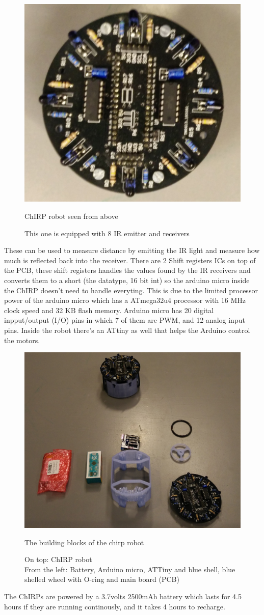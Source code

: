 \begin{figure}[h]
\centering
\includegraphics[width=0.8\linewidth]{images/chirpAbove.jpg}
\caption{ChIRP robot seen from above}
\caption*{This one is equipped with 8 IR emitter and receivers}
\end{figure}
These can be used to measure distance by emitting the IR light and measure how much is reflected back into the receiver. There are 2 Shift registers ICs on top of the PCB, these shift registers handles the values found by the IR receivers and converts them to a short (the datatype, 16 bit int) so the arduino micro inside the ChIRP doesn't need to handle everyting. This is due to the limited processor power of the arduino micro which has a ATmega32u4 processor with 16 MHz clock speed and 32 KB flash memory. Arduino micro has 20 digital inpput/output (I/O) pins in which 7 of them are PWM, and 12 analog input pins. Inside the robot there's an ATtiny as well that helps the Arduino control the motors.


\begin{figure}[h]
\centering
\includegraphics[width=0.8\linewidth]{images/chirpPieces.jpg}
\caption{The building blocks of the chirp robot}
\caption*{On top: ChIRP robot\\From the left: Battery, Arduino micro, ATTiny and blue shell, blue shelled wheel with O-ring and main board (PCB)}
\end{figure}
The ChIRPs are powered by a 3.7volts 2500mAh battery which lasts for 4.5 hours if they are running continously, and it takes 4 hours to recharge.

